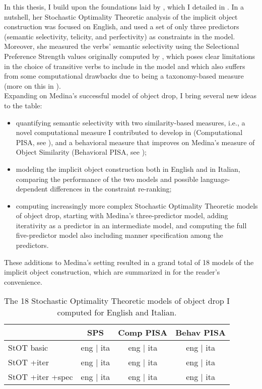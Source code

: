 In this thesis, I build upon the foundations laid by \textcite{Medina2007}, which I detailed in . In a nutshell, her Stochastic Optimality Theoretic analysis of the implicit object construction was focused on English, and used a set of only three predictors (semantic selectivity, telicity, and perfectivity) as constraints in the model. Moreover, she measured the verbs' semantic selectivity using the Selectional Preference Strength values originally computed by \textcite{Resnik1993,Resnik1996}, which poses clear limitations in the choice of transitive verbs to include in the model and which also suffers from some computational drawbacks due to being a taxonomy-based measure (more on this in ).\\
Expanding on Medina's successful model of object drop, I bring several new ideas to the table:
\begin{itemize}
    \item quantifying semantic selectivity with two similarity-based measures, i.e., a novel computational measure I contributed to develop in \textcite{CappelliLenciPISA} (Computational PISA, see ), and a behavioral measure that improves on Medina's measure of Object Similarity (Behavioral PISA, see );
    \item modeling the implicit object construction both in English and in Italian, comparing the performance of the two models and possible language-dependent differences in the constraint re-ranking;
    \item computing increasingly more complex Stochastic Optimality Theoretic models of object drop, starting with Medina's three-predictor model, adding iterativity as a predictor in an intermediate model, and computing the full five-predictor model also including manner specification among the predictors.
\end{itemize}
These additions to Medina's setting resulted in a grand total of 18 models of the implicit object construction, which are summarized in  for the reader's convenience.

\begin{table}[htb] %
\caption{The 18 Stochastic Optimality Theoretic models of object drop I computed for English and Italian.}
\begin{tabular}{l|ccc}
& SPS & Comp PISA & Behav PISA \\
\hline
StOT basic & eng | ita          & eng | ita   & eng | ita   \\
StOT +iter & eng | ita  & eng | ita & eng | ita \\
StOT +iter +spec & eng | ita   & eng | ita   & eng | ita  
\end{tabular}
\end{table}

